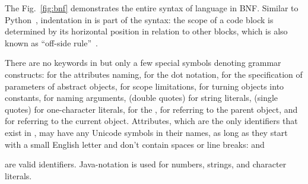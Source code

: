 \newcommand\sntx[1]{{\color{blue!50!black}\sffamily #1}}

The Fig.~\ref{fig:bnf} demonstrates the entire syntax of \eo{} language in BNF.
Similar to Python~\citep{lutz2013learning}, indentation in \eo{} is part of the syntax:
the scope of a code block is determined by its horizontal position
in relation to other blocks, which is also known as ``off-side rule''~\citep{landin1966next}.

There are no keywords in \eo{} but only a few special symbols
denoting grammar constructs:
  \ff{>} for the attributes naming,
   for the dot notation,
  \ff{[]} for the specification of parameters of abstract objects,
  \ff{()} for scope limitations,
  \ff{!} for turning objects into constants,
  \ff{:} for naming arguments,
   (double quotes) for string literals,
   (single quotes) for one-character literals,
   for the ,
  \ff{\^{}} for referring to the parent object,
  and
  \ff{\$} for referring to the current object.
Attributes, which are the only identifiers that exist in \eo{}, may have
any Unicode symbols in their names, as long as they start with a small English letter
and don't contain spaces or line breaks:
 and
\begin{CJK}{UTF8}{gbsn}
\end{CJK}
 are valid identifiers.
Java-notation is used for numbers, strings, and character literals.

